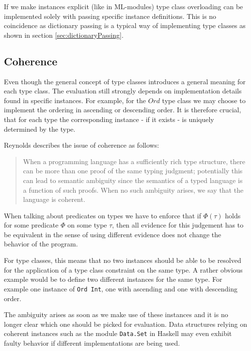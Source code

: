 If we make instances explicit (like in ML-modules) type class overloading can be implemented solely with passing specific instance definitions.
This is no coincidence as dictionary passing is a typical way of implementing type classes as shown in section \ref{sec:dictionaryPassing}.

\subsection{Coherence}\label{sec:coherence}

Even though the general concept of type classes introduces a general meaning for each type class.
The evaluation still strongly depends on implementation details found in specific instances.
For example, for the $\mathit{Ord}$ type class we may choose to implement the ordering in ascending or descending order.
It is therefore crucial, that for each type the corresponding instance - if it exists - is uniquely determined by the type.

Reynolds \cite{reynolds_coherence} describes the issue of coherence as follows:

\begin{quote}
  When a programming language has a sufficiently rich type structure, there can be more than one proof of the same
  typing judgment; potentially this can lead to semantic ambiguity since the semantics of a typed language is a function
  of such proofs. When no such ambiguity arises, we say that the language is coherent.
\end{quote}

When talking about predicates on types we have to enforce that if $\Phi(\tau)$ holds for some predicate $\Phi$ on some type $\tau$,
then all evidence for this judgement has to be equivalent in the sense of using different evidence does not change the behavior of the program.

For type classes, this means that no two instances should be able to be resolved for the application of a type class constraint on the same type.
A rather obvious example would be to define two different instances for the same type.
For example one instance of \texttt{Ord Int}, one with ascending and one with descending order.

The ambiguity arises as soon as we make use of these instances and it is no longer clear which one should be picked for evaluation.
Data structures relying on coherent instances such as the module \texttt{Data.Set} in Haskell may even exhibit faulty behavior if different implementations are being used. \cite{Kilpatrick2019-cy}

